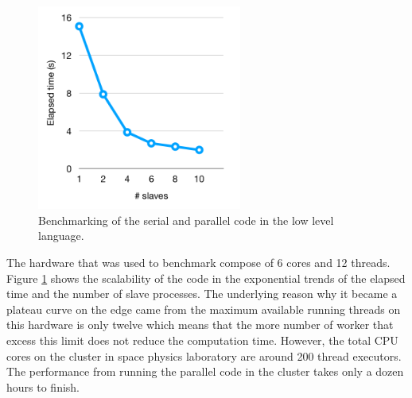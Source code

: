 \begin{figure}[h]
    \centering
    \includegraphics[width=0.6\textwidth]{appendix/exposure/ms_perf.png}
    \caption{
        Benchmarking of the serial and parallel code
        in the low level language.
    }
    \label{fig:parallel_benchmark}
\end{figure}

The hardware that was used to benchmark compose of 6 cores and 
12 threads. Figure \ref{fig:parallel_benchmark} shows the 
scalability of the code in the exponential trends of 
the elapsed time and the number of slave processes.
The underlying reason why it became a plateau curve on the 
edge came from the maximum available running threads on this hardware
is only twelve which means that the more number of worker that 
excess this limit does not reduce the computation time.
However, the total CPU cores on the cluster in space
physics laboratory are around 200 thread executors.
The performance from running the parallel code in the cluster 
takes only a dozen hours to finish.


